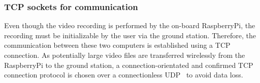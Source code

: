 \subsubsection{TCP sockets for communication}\label{subsubsec:4_tcp_sockets}
Even though the video recording is performed by the on-board RaspberryPi, the
recording must be initializable by the user via the ground station.
Therefore, the communication between these two computers is established using
a \ac{TCP}~\cite{cerfProtocolPacketNetwork1974} connection.
As potentially large video files are transferred wirelessly from the
RaspberryPi to the ground station, a connection-orientated and confirmed
\ac{TCP} connection protocol is chosen over a connectionless
\ac{UDP}~\cite{SpecificationInternetTransmission1974} to avoid data loss.\\\\

